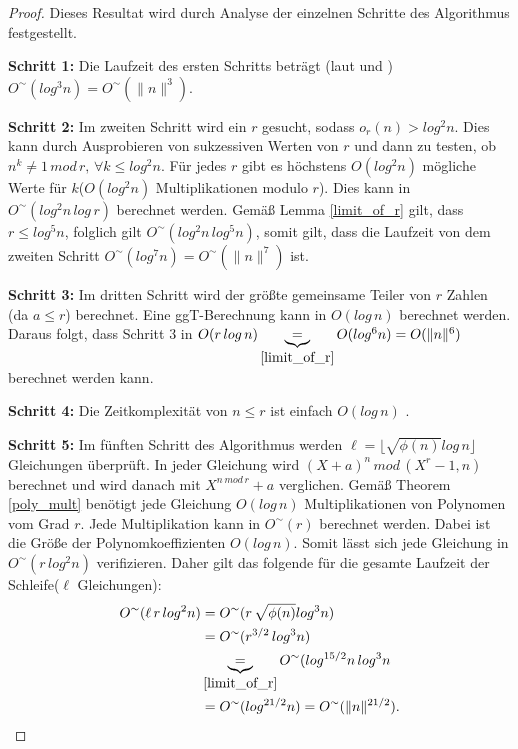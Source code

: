 \documentclass[12pt,oneside]{article}
\theoremstyle{remark}
\theoremstyle{definition}
\begin{document}
\begin{proof}
Dieses Resultat wird durch Analyse der einzelnen Schritte des Algorithmus festgestellt.

\textbf{Schritt 1:}\newline
Die Laufzeit des ersten Schritts beträgt (laut \cite{computer-algebra} und \cite{D73}) $O^{\sim}(log^3 n) = O^{\sim}(\lVert n \rVert^3)$.

\textbf{Schritt 2:}\newline
Im zweiten Schritt wird ein $r$ gesucht, sodass $o_{r}(n) > log^2 n$. Dies kann durch Ausprobieren von sukzessiven Werten von $r$ und dann zu testen, ob $n^k \neq 1 \,  mod \, r, \, \forall k \leq log^2 n$. Für jedes $r$ gibt es höchstens $O(log^2 n)$ mögliche Werte für $k$($O(log^2n)$ Multiplikationen modulo $r$). Dies kann in $O^{\sim}(log^2 n \, log \, r)$ berechnet werden.\newline\newline
Gemäß Lemma \ref{limit_of_r} gilt, dass $ r \leq log^5 n$, folglich gilt $O^{\sim}(log^2 n \, log^5 n)$, somit gilt, dass die Laufzeit von dem zweiten Schritt $O^{\sim}(log^7 n) = O^{\sim}(\lVert n \rVert^7)$ ist. 


\textbf{Schritt 3:}\newline
Im dritten Schritt wird der größte gemeinsame Teiler von $r$ Zahlen (da $a \leq r$) berechnet. Eine ggT-Berechnung kann in $O(log \,n)$ berechnet werden\cite{D73}. Daraus folgt, dass Schritt 3 in $O(r \, log \, n) \underbrace{=}_{\ref{limit_of_r}} O(log^6 n) = O(\lVert n \rVert^6)$ berechnet werden kann. 

\textbf{Schritt 4:}\newline
Die Zeitkomplexität von $n \leq r$ ist einfach $O(log \, n)$ \cite{computer-algebra}.

\textbf{Schritt 5:}\newline
Im fünften Schritt des Algorithmus werden $\ell = \lfloor \sqrt{\phi(n)} log \, n \rfloor$ Gleichungen überprüft. In jeder Gleichung wird $(X + a)^n \, mod \, (X^r - 1,n)$ berechnet und wird danach mit $X^{n \, mod \, r} + a$ verglichen. Gemäß Theorem \ref{poly_mult} benötigt jede Gleichung $O(log \, n)$ Multiplikationen von Polynomen vom Grad $r$. Jede Multiplikation kann in $O^{\sim}(r)$ berechnet werden. Dabei ist die Größe der Polynomkoeffizienten $O(log \, n)$. Somit lässt sich jede Gleichung in $O^{\sim}(r \, log^2n)$ verifizieren. Daher gilt das folgende für die gesamte Laufzeit der Schleife($\ell$ Gleichungen):\newline
\begin{align*}
    O^{\sim}(\ell \, r \, log^2n) &= O^{\sim}(r \, \sqrt{\phi(n)} log^3 n)  \\
    &= O^{\sim}(r^{3/2} \, log^3 n) \\
    &\underbrace{=}_{\ref{limit_of_r}} O^{\sim}(log^{15/2}n \, log^3n \\ 
    &=O^{\sim}(log^{21/2}n) = O^{\sim}( \lVert n \rVert^{21/2}).
\end{align*}


\end{proof}
\end{document}
